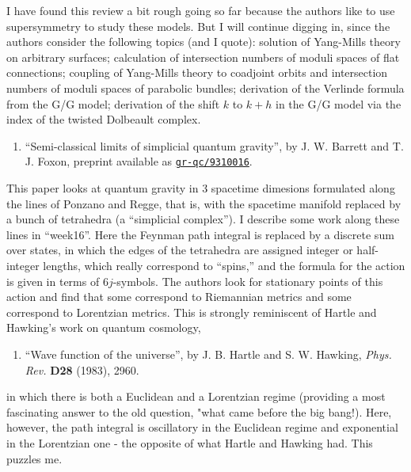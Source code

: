 \documentclass{article}
\def\tightlist{}
\begin{document}
I have found this review a bit rough going so far because the authors
like to use supersymmetry to study these models. But I will continue
digging in, since the authors consider the following topics (and I
quote): solution of Yang-Mills theory on arbitrary surfaces; calculation
of intersection numbers of moduli spaces of flat connections; coupling
of Yang-Mills theory to coadjoint orbits and intersection numbers of
moduli spaces of parabolic bundles; derivation of the Verlinde formula
from the G/G model; derivation of the shift \(k\) to \(k+h\) in the G/G
model via the index of the twisted Dolbeault complex.

\begin{enumerate}
\def\labelenumi{\arabic{enumi})}
\setcounter{enumi}{2}
\tightlist
\item
  ``Semi-classical limits of simplicial quantum gravity'', by J. W.
  Barrett and T. J. Foxon, preprint available as
  \href{http://xxx.lanl.gov/abs/gr-qc/9310016}{\texttt{gr-qc/9310016}}.
\end{enumerate}

This paper looks at quantum gravity in 3 spacetime dimesions formulated
along the lines of Ponzano and Regge, that is, with the spacetime
manifold replaced by a bunch of tetrahedra (a ``simplicial complex''). I
describe some work along these lines in ``week16''. Here the Feynman
path integral is replaced by a discrete sum over states, in which the
edges of the tetrahedra are assigned integer or half-integer lengths,
which really correspond to ``spins,'' and the formula for the action is
given in terms of \(6j\)-symbols. The authors look for stationary points
of this action and find that some correspond to Riemannian metrics and
some correspond to Lorentzian metrics. This is strongly reminiscent of
Hartle and Hawking's work on quantum cosmology,

\begin{enumerate}
\def\labelenumi{\arabic{enumi})}
\setcounter{enumi}{3}
\tightlist
\item
  ``Wave function of the universe'', by J. B. Hartle and S. W. Hawking,
  \emph{Phys. Rev.} \textbf{D28} (1983), 2960.
\end{enumerate}

in which there is both a Euclidean and a Lorentzian regime (providing a
most fascinating answer to the old question, "what came before the big
bang!). Here, however, the path integral is oscillatory in the Euclidean
regime and exponential in the Lorentzian one - the opposite of what
Hartle and Hawking had. This puzzles me.
\end{document}

